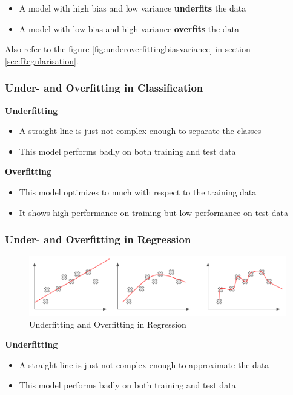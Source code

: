\documentclass[11pt]{article}
\begin{document}
\begin{itemize}
    \item A model with high bias and low variance \textbf{underfits} the data
    \item A model with low bias and high variance \textbf{overfits} the data
\end{itemize}

Also refer to the figure \ref{fig:underoverfittingbiasvariance} in section \ref{sec:Regularisation}.

\subsubsection{Under- and Overfitting in Classification}
\noindent
\textbf{Underfitting}
\begin{itemize}
    \item A straight line is just not complex enough to separate the classes
    \item This model performs badly on both training and test data
\end{itemize}

\noindent
\textbf{Overfitting}
\begin{itemize}
    \item This model optimizes to much with respect to the training data
    \item It shows high performance on training but low performance on test data
\end{itemize}

\subsubsection{Under- and Overfitting in Regression}

\begin{figure}[tbh!]
    \centering
    \includegraphics[width=0.7\linewidth, keepaspectratio]{Pictures/underfitting_overfitting_regression}
    \caption{Underfitting and Overfitting in Regression}
    \label{fig:underfittingoverfittingregression}
\end{figure}

\vspace{1em}

\noindent
\textbf{Underfitting}
\begin{itemize}
    \item A straight line is just not complex enough to approximate the data
    \item This model performs badly on both training and test data
\end{itemize}
\end{document}
